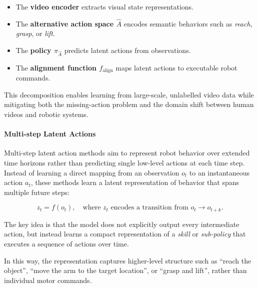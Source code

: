 \begin{itemize}
    \item The \textbf{video encoder} extracts visual state representations.
    \item The \textbf{alternative action space $\hat{A}$} encodes semantic behaviors such as \textit{reach}, \textit{grasp}, or \textit{lift}.
    \item The \textbf{policy $\pi_{\hat{A}}$} predicts latent actions from observations.
    \item The \textbf{alignment function $f_{\text{align}}$} maps latent actions to executable robot commands.
\end{itemize}

This decomposition enables learning from large-scale, unlabelled video data while mitigating both the missing-action problem and the domain shift between human videos and robotic systems.






\paragraph{Multi-step Latent Actions}

Multi-step latent action methods aim to represent robot behavior over extended time horizons rather than predicting single low-level actions at each time step. 
Instead of learning a direct mapping from an observation $o_t$ to an instantaneous action $a_t$, these methods learn a latent representation of behavior that spans multiple future steps:

\[
z_t = f(o_t), \quad \text{where } z_t \text{ encodes a transition from } o_t \rightarrow o_{t+k}.
\]

The key idea is that the model does not explicitly output every intermediate action, but instead learns a compact representation of a \emph{skill} or \emph{sub-policy} that executes a sequence of actions over time.

In this way, the representation captures higher-level structure such as “reach the object”, “move the arm to the target location”, or “grasp and lift”, rather than individual motor commands.

